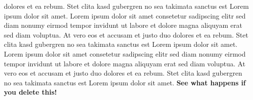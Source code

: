 {dolores et ea rebum. Stet clita kasd gubergren no sea takimata sanctus est Lorem ipsum dolor sit amet. Lorem ipsum dolor sit amet consetetur sadipscing elitr sed diam nonumy eirmod tempor invidunt ut labore et dolore magna aliquyam erat sed diam voluptua. At vero eos et accusam et justo duo dolores et ea rebum. Stet clita kasd gubergren no sea takimata sanctus est Lorem ipsum dolor sit amet. Lorem ipsum dolor sit amet consetetur sadipscing elitr sed diam nonumy eirmod tempor invidunt ut labore et dolore magna aliquyam erat sed diam voluptua. At vero eos et accusam et justo duo dolores et ea rebum. Stet clita kasd gubergren no sea takimata sanctus est Lorem ipsum dolor sit amet. \textbf{See what happens if you delete this!}
}


